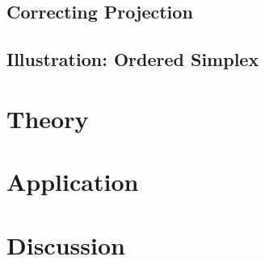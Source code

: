 \documentclass[10pt]{article}
\begin{document}
\subsection{Correcting Projection}

\subsection{Illustration: Ordered Simplex}

\section{Theory}
\section{Application}
\section{Discussion}





\end{document}
